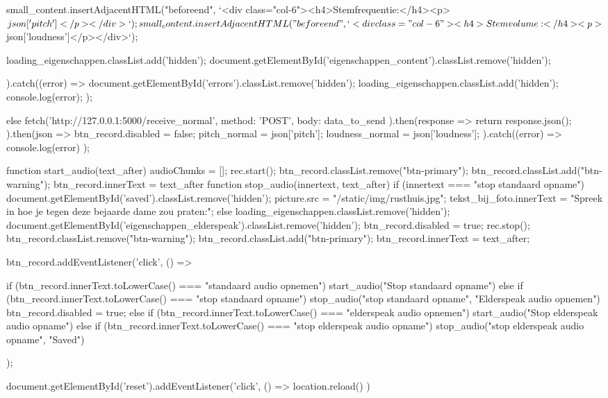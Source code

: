 \begin{python}
{{{            small_content.insertAdjacentHTML("beforeend", `<div class="col-6"><h4>Stemfrequentie:</h4><p>${json['pitch']}</p></div>`);
            small_content.insertAdjacentHTML("beforeend", `<div class="col-6"><h4>Stemvolume:</h4><p>${json['loudness']}</p></div>`);

            loading_eigenschappen.classList.add('hidden');
            document.getElementById('eigenschappen_content').classList.remove('hidden');
        }).catch((error) => {
            document.getElementById('errors').classList.remove('hidden');
            loading_eigenschappen.classList.add('hidden');
            console.log(error);
        });
    } else {
        fetch('http://127.0.0.1:5000/receive_normal', {
            method: 'POST',
            body: data_to_send
        }).then(response => {
            return response.json();
        }).then(json => {
            btn_record.disabled = false;
            pitch_normal = json['pitch'];
            loudness_normal = json['loudness'];
        }).catch((error) => {
            console.log(error)
        });
    }

}

function start_audio(text_after){
    audioChunks = [];
    rec.start();
    btn_record.classList.remove("btn-primary");
    btn_record.classList.add("btn-warning");
    btn_record.innerText = text_after
}
function stop_audio(innertext, text_after){
    if (innertext === "stop standaard opname") {
        document.getElementById('saved').classList.remove('hidden');
        picture.src = "/static/img/rusthuis.jpg";
        tekst_bij_foto.innerText = "Spreek in hoe je tegen deze bejaarde dame zou praten:";
    } else {
        loading_eigenschappen.classList.remove('hidden');
        document.getElementById('eigenschappen_elderspeak').classList.remove('hidden');
        btn_record.disabled = true;
    }
    rec.stop();
    btn_record.classList.remove("btn-warning");
    btn_record.classList.add("btn-primary");
    btn_record.innerText = text_after;
}

btn_record.addEventListener('click', () => {
    if (btn_record.innerText.toLowerCase() === "standaard audio opnemen"){
        start_audio("Stop standaard opname")
    } else if (btn_record.innerText.toLowerCase() === "stop standaard opname"){
        stop_audio("stop standaard opname", "Elderspeak audio opnemen")
        btn_record.disabled = true;
    } else if (btn_record.innerText.toLowerCase() === "elderspeak audio opnemen"){
        start_audio("Stop elderspeak audio opname")
    } else if (btn_record.innerText.toLowerCase() === "stop elderspeak audio opname"){
        stop_audio("stop elderspeak audio opname", "Saved")
    }

});

document.getElementById('reset').addEventListener('click', () => {
    location.reload()
})
\end{python}

